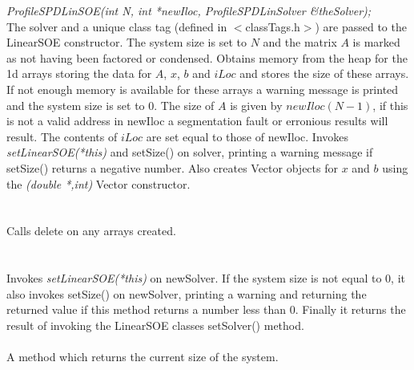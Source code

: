 {\em ProfileSPDLinSOE(int N, int *newIloc,
		  ProfileSPDLinSolver \&theSolver); }\\
The \p solver and a unique class tag (defined in $<$classTags.h$>$)
are passed to the LinearSOE constructor. The system size is set
to $N$ and the matrix $A$ is marked as not having been
factored or condensed. Obtains memory from the heap for the 1d arrays storing the
data for $A$, $x$, $b$ and $iLoc$ and stores the size of these arrays. If not
enough memory is available for these arrays a warning message is
printed and the system size is set to $0$. The size of $A$ is given
by $newIloc(N-1)$, if this is not a valid address in \p newIloc a
segmentation fault or erronious results will result. The contents of
$iLoc$ are set equal to those of \p newIloc. Invokes {\em
setLinearSOE(*this)} and setSize() on \p solver,
printing a warning message if setSize() returns a negative
number. Also creates Vector objects for $x$ and $b$ using the {\em
(double *,int)} Vector constructor. \\

 \\
\\ 
Calls delete on any arrays created. \\

  \\
\\
Invokes {\em setLinearSOE(*this)} on \p newSolver.
If the system size is not equal to $0$, it also invokes setSize()
on \p newSolver, printing a warning and returning the returned value if this
method returns a number less than $0$. Finally it returns the result
of invoking the LinearSOE classes setSolver() method. \\

 \\
A method which returns the current size of the system. \\

